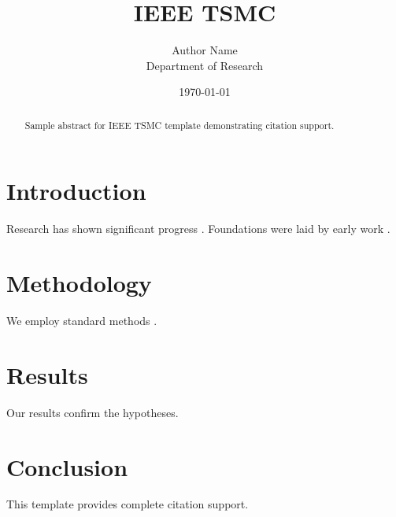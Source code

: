 ﻿\documentclass{IEEEtran}
\title{IEEE TSMC}
\author{Author Name \\ \small Department of Research}
\date{\today}
\begin{document}
\maketitle

\begin{abstract}
Sample abstract for IEEE TSMC template demonstrating citation support.
\end{abstract}

\section{Introduction}
Research has shown significant progress \citep{einstein1905}. Foundations were laid by early work \citep{turing1950}.

\section{Methodology}
We employ standard methods \citep{knuth1984}.

\section{Results}
Our results confirm the hypotheses.

\section{Conclusion}
This template provides complete citation support.



\end{document}

